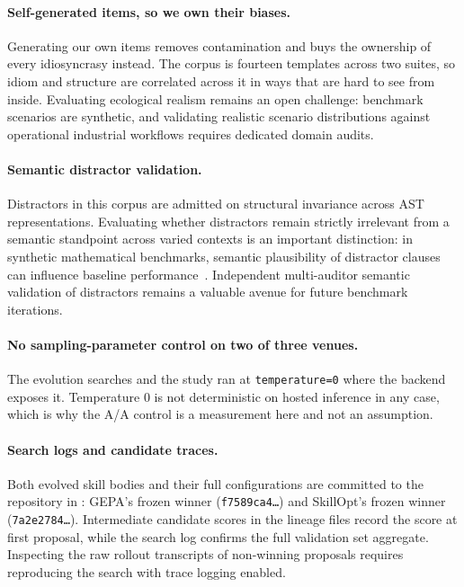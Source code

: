 \paragraph{Self-generated items, so we own their biases.} Generating our own
items removes contamination and buys the ownership of every idiosyncrasy
instead. The corpus is fourteen templates across two suites, so idiom
and structure are correlated across it in ways that are hard to see from
inside. Evaluating ecological realism remains an open challenge: benchmark scenarios are
synthetic, and validating realistic scenario distributions against operational
industrial workflows requires dedicated domain audits.

\paragraph{Semantic distractor validation.} Distractors in this corpus are admitted
on structural invariance across AST representations. Evaluating whether distractors
remain strictly irrelevant from a semantic standpoint across varied contexts is an
important distinction: in synthetic mathematical benchmarks, semantic plausibility
of distractor clauses can influence baseline performance~\citep{gsmsymbolic2024}.
Independent multi-auditor semantic validation of distractors remains a valuable
avenue for future benchmark iterations.

\paragraph{No sampling-parameter control on two of three venues.} The
evolution searches and the study ran at \texttt{temperature=0} where the
backend exposes it. Temperature 0 is not deterministic on hosted inference in
any case, which is why the A/A control is a measurement here and not an
assumption.

\paragraph{Search logs and candidate traces.} Both evolved skill bodies and their full
configurations are committed to the repository in :
GEPA's frozen winner (\texttt{f7589ca4\ldots}) and SkillOpt's frozen winner
(\texttt{7a2e2784\ldots}). Intermediate candidate scores in the lineage files
record the score at first proposal, while the search log confirms the full
validation set aggregate. Inspecting the raw rollout transcripts of non-winning
proposals requires reproducing the search with trace logging enabled.

